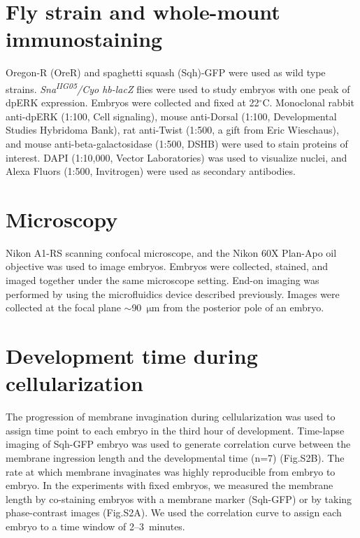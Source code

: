 \documentclass{pnastwo}
\newcommand{\fig}[0]{Fig.}
\begin{document}
\begin{article}
\begin{materials}
\section{Fly strain and whole-mount immunostaining}
%
Oregon-R (OreR) and spaghetti squash (Sqh)-GFP were used as wild type strains. 
%
{\it Sna\textsuperscript{\it IIG05}/Cyo hb-lacZ} flies were used to study embryos with one peak of dpERK expression.  
%
Embryos were collected and fixed at 22$^\circ$C. 
%
Monoclonal rabbit anti-dpERK (1:100, Cell signaling), mouse anti-Dorsal (1:100, Developmental Studies Hybridoma Bank), rat anti-Twist (1:500, a gift from Eric Wieschaus), and mouse anti-beta-galactosidase (1:500, DSHB) were used to stain proteins of interest. DAPI (1:10,000, Vector Laboratories) was used to visualize nuclei, and Alexa Fluors (1:500, Invitrogen) were used as secondary antibodies. 

\section{Microscopy}
%
Nikon A1-RS scanning confocal microscope, and the Nikon 60X Plan-Apo oil objective was used to image embryos. Embryos were collected, stained, and imaged together under the same microscope setting. End-on imaging was performed by using the microfluidics device described previously. Images were collected at the focal plane $\sim$90~$\mathrm{\mu m}$ from the posterior pole of an embryo. 

\section{Development time during cellularization} 
%
The progression of membrane invagination during cellularization was used to assign time point to each embryo in the third hour of development. Time-lapse imaging of Sqh-GFP embryo was used to generate correlation curve between the membrane ingression length and the developmental time (n=7) (\fig S2B). The rate at which membrane invaginates was highly reproducible from embryo to embryo. In the experiments with fixed embryos, we measured the membrane length by co-staining embryos with a membrane marker (Sqh-GFP) or by taking phase-contrast images (\fig S2A). We used the correlation curve to assign each embryo to a time window of 2--3~minutes. 

\end{materials}





\end{article}
\end{document}
